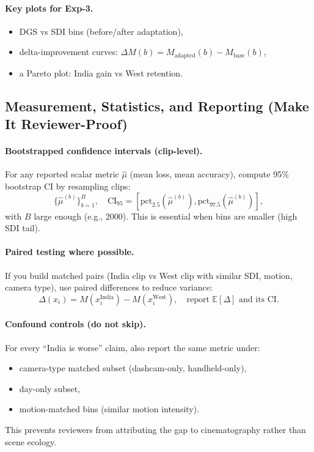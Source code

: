 \paragraph{Key plots for Exp-3.}
\begin{itemize}[leftmargin=*,itemsep=2pt]
  \item DGS vs SDI bins (before/after adaptation),
  \item delta-improvement curves: $\Delta M(b)=M_{\text{adapted}}(b)-M_{\text{base}}(b)$,
  \item a Pareto plot: India gain vs West retention.
\end{itemize}

\subsection{Measurement, Statistics, and Reporting (Make It Reviewer-Proof)}
\label{sec:measurement}

\paragraph{Bootstrapped confidence intervals (clip-level).}
For any reported scalar metric $\hat{\mu}$ (mean loss, mean accuracy), compute 95\% bootstrap CI by resampling clips:
\[
\{\hat{\mu}^{(b)}\}_{b=1}^{B}, \quad \mathrm{CI}_{95} = [\mathrm{pct}_{2.5}(\hat{\mu}^{(b)}), \mathrm{pct}_{97.5}(\hat{\mu}^{(b)})],
\]
with $B$ large enough (e.g., 2000). This is essential when bins are smaller (high SDI tail).

\paragraph{Paired testing where possible.}
If you build matched pairs (India clip vs West clip with similar SDI, motion, camera type), use paired differences to reduce variance:
\[
\Delta(x_i) = M(x_i^{\mathrm{India}}) - M(x_i^{\mathrm{West}}),
\quad \text{report } \mathbb{E}[\Delta] \text{ and its CI}.
\]

\paragraph{Confound controls (do not skip).}
For every “India is worse” claim, also report the same metric under:
\begin{itemize}[leftmargin=*,itemsep=2pt]
  \item camera-type matched subset (dashcam-only, handheld-only),
  \item day-only subset,
  \item motion-matched bins (similar motion intensity).
\end{itemize}
This prevents reviewers from attributing the gap to cinematography rather than scene ecology.

